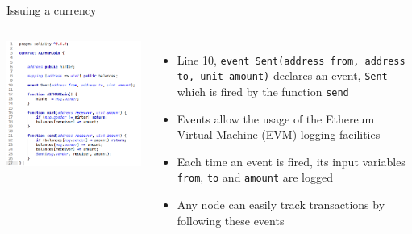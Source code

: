 \documentclass[9pt]{beamer}
\begin{document}
\begin{frame}{Issuing a currency}
	\begin{columns}
	    \includegraphics  [scale=0.3]{Images/contract5}

	    \begin{itemize}
			\item Line 10, \texttt{event Sent(address from, address to, unit amount)} declares an event, \texttt{Sent} which is fired by the function \texttt{send}
			\item Events allow the usage of the Ethereum Virtual Machine (EVM) logging facilities
			\item Each time an event is fired, its input variables \texttt{from}, \texttt{to} and \texttt{amount} are logged
			\item Any node can easily track transactions by following these events
	    \end{itemize}
	\end{columns}
\end{frame}

\end{document}
